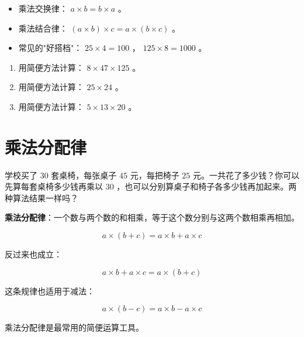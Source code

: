 \begin{keytakeaway}


\begin{itemize}
  \item 乘法交换律： $a \times b = b \times a$ 。
  \item 乘法结合律： $(a \times b) \times c = a \times (b \times c)$ 。
  \item 常见的"好搭档"： $25 \times 4 = 100$ ， $125 \times 8 = 1000$ 。
\end{itemize}


\end{keytakeaway}

\begin{practice}


\begin{enumerate}
  \item 用简便方法计算： $8 \times 47 \times 125$ 。
  \item 用简便方法计算： $25 \times 24$ 。
  \item 用简便方法计算： $5 \times 13 \times 20$ 。
\end{enumerate}


\end{practice}

\section*{乘法分配律}


\begin{explore}


学校买了 $30$ 套桌椅，每张桌子 $45$ 元，每把椅子 $25$ 元。一共花了多少钱？你可以先算每套桌椅多少钱再乘以 $30$ ，也可以分别算桌子和椅子各多少钱再加起来。两种算法结果一样吗？

\end{explore}

\begin{understand}


\textbf{乘法分配律}：一个数与两个数的和相乘，等于这个数分别与这两个数相乘再相加。

\[
a \times (b + c) = a \times b + a \times c
\]


反过来也成立：

\[
a \times b + a \times c = a \times (b + c)
\]


这条规律也适用于减法：

\[
a \times (b - c) = a \times b - a \times c
\]


乘法分配律是最常用的简便运算工具。

\end{understand}

